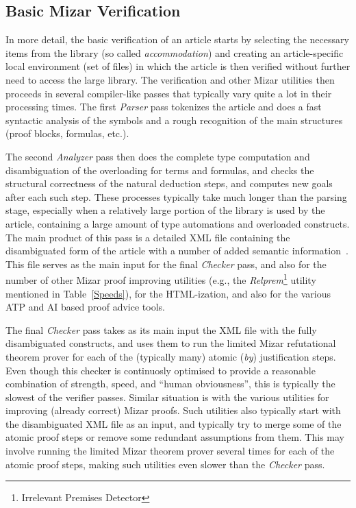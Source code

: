 \documentclass{llncs}
\begin{document}
\subsection{Basic Mizar Verification}
\label{Basic}
In more detail, the basic verification of an article starts by
selecting the necessary items from the library (so called
\emph{accommodation}) and creating an article-specific local
environment (set of files) in which the article is then verified
without further need to access the large library.  The verification
and other Mizar utilities then proceeds in several compiler-like
passes that typically vary quite a lot in their processing times. The
first \emph{Parser} pass tokenizes the article and does a fast
syntactic analysis of the symbols and a rough recognition of the main
structures (proof blocks, formulas, etc.).

The second \emph{Analyzer} pass then does the complete type
computation and disambiguation of the overloading for terms and
formulas, and checks the structural correctness of the natural
deduction steps, and computes new goals after each such step. These
processes typically take much longer than the parsing stage,
especially when a relatively large portion of the library is used by
the article, containing a large amount of type automations and
overloaded constructs. The main product of this pass is a detailed XML
file containing the disambiguated form of the article with a number of
added semantic information~\cite{Urban05}.  This file serves as the main input for
the final \emph{Checker} pass, and also for the number of other Mizar
proof improving utilities (e.g., the
\emph{Relprem}\footnote{Irrelevant Premises Detector} utility
mentioned in Table~\ref{Speeds}), for the HTML-ization, and also for
the various ATP and AI based proof advice tools.

The final \emph{Checker} pass takes as its main input the XML file
with the fully disambiguated constructs, and uses them to run the
limited Mizar refutational theorem prover for each of the (typically
many) atomic (\emph{by}) justification steps. Even though this checker
is continuosly optimised to provide a reasonable combination of
strength, speed, and ``human obviousness'', this is typically the
slowest of the verifier passes. Similar situation is with the various
utilities for improving (already correct) Mizar proofs.  Such
utilities also typically start with the disambiguated XML file as an
input, and typically try to merge some of the atomic proof steps or
remove some redundant assumptions from them. This may involve running
the limited Mizar theorem prover several times for each of the atomic
proof steps, making such utilities even slower than the \emph{Checker}
pass.
\end{document}
